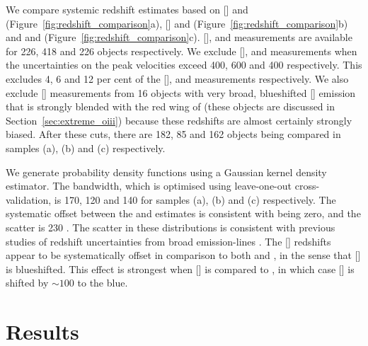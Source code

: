 We compare systemic redshift estimates based on [] and \hb (Figure~\ref{fig:redshift_comparison}a), [] and \ha (Figure~\ref{fig:redshift_comparison}b) and \hb and \ha (Figure~\ref{fig:redshift_comparison}c). 
[], \hb and \ha measurements are available for 226, 418 and 226 objects respectively. 
We exclude [], \hb and \ha measurements when the uncertainties on the peak velocities exceed 400, 600 and 400 \kms respectively. 
This excludes 4, 6 and 12 per cent of the [], \hb and \ha measurements respectively. 
We also exclude [] measurements from 16 objects with very broad, blueshifted [] emission that is strongly blended with the red wing of \hb (these objects are discussed in Section~\ref{sec:extreme_oiii}) because these redshifts are almost certainly strongly biased.
After these cuts, there are 182, 85 and 162 objects being compared in samples (a), (b) and (c) respectively. 

We generate probability density functions using a Gaussian kernel density estimator.
The bandwidth, which is optimised using leave-one-out cross-validation, is 170, 120 and 140 \kms for samples (a), (b) and (c) respectively. 
The systematic offset between the \ha and \hb estimates is consistent with being zero, and the scatter is 230 \kms. 
The scatter in these distributions is consistent with previous studies of redshift uncertainties from broad emission-lines \citep[e.g.][]{shen16b}. 
The [] redshifts appear to be systematically offset in comparison to both \ha and \hbns, in the sense that [] is blueshifted. 
This effect is strongest when [] is compared to \hbns, in which case [] is shifted by $\sim100$ \kms to the blue.

\section{Results}

